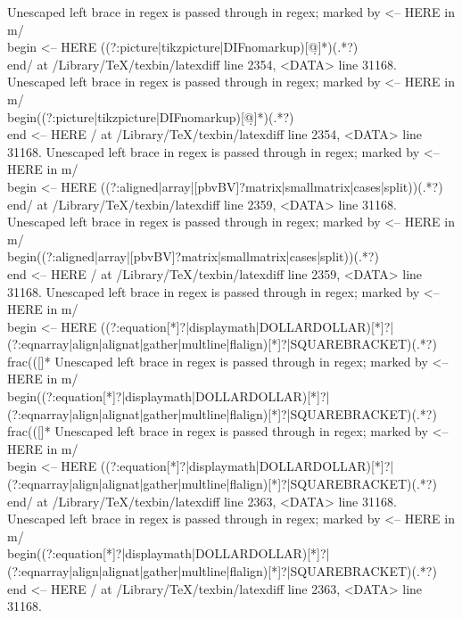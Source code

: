 Unescaped left brace in regex is passed through in regex; marked by <-- HERE in m/\\begin{ <-- HERE ((?:picture|tikzpicture|DIFnomarkup)[\w\d*@]*)}(.*?)\\end{\1}/ at /Library/TeX/texbin/latexdiff line 2354, <DATA> line 31168.
Unescaped left brace in regex is passed through in regex; marked by <-- HERE in m/\\begin{((?:picture|tikzpicture|DIFnomarkup)[\w\d*@]*)}(.*?)\\end{ <-- HERE \1}/ at /Library/TeX/texbin/latexdiff line 2354, <DATA> line 31168.
Unescaped left brace in regex is passed through in regex; marked by <-- HERE in m/\\begin{ <-- HERE ((?:aligned|array|[pbvBV]?matrix|smallmatrix|cases|split))}(.*?)\\end{\1}/ at /Library/TeX/texbin/latexdiff line 2359, <DATA> line 31168.
Unescaped left brace in regex is passed through in regex; marked by <-- HERE in m/\\begin{((?:aligned|array|[pbvBV]?matrix|smallmatrix|cases|split))}(.*?)\\end{ <-- HERE \1}/ at /Library/TeX/texbin/latexdiff line 2359, <DATA> line 31168.
Unescaped left brace in regex is passed through in regex; marked by <-- HERE in m/\\begin{ <-- HERE ((?:equation[*]?|displaymath|DOLLARDOLLAR)[*]?|(?:eqnarray|align|alignat|gather|multline|flalign)[*]?|SQUAREBRACKET)}(.*?)\\frac(([\s]*%
Unescaped left brace in regex is passed through in regex; marked by <-- HERE in m/\\begin{((?:equation[*]?|displaymath|DOLLARDOLLAR)[*]?|(?:eqnarray|align|alignat|gather|multline|flalign)[*]?|SQUAREBRACKET)}(.*?)\\frac(([\s]*%
Unescaped left brace in regex is passed through in regex; marked by <-- HERE in m/\\begin{ <-- HERE ((?:equation[*]?|displaymath|DOLLARDOLLAR)[*]?|(?:eqnarray|align|alignat|gather|multline|flalign)[*]?|SQUAREBRACKET)}(.*?)\\end{\1}/ at /Library/TeX/texbin/latexdiff line 2363, <DATA> line 31168.
Unescaped left brace in regex is passed through in regex; marked by <-- HERE in m/\\begin{((?:equation[*]?|displaymath|DOLLARDOLLAR)[*]?|(?:eqnarray|align|alignat|gather|multline|flalign)[*]?|SQUAREBRACKET)}(.*?)\\end{ <-- HERE \1}/ at /Library/TeX/texbin/latexdiff line 2363, <DATA> line 31168.

